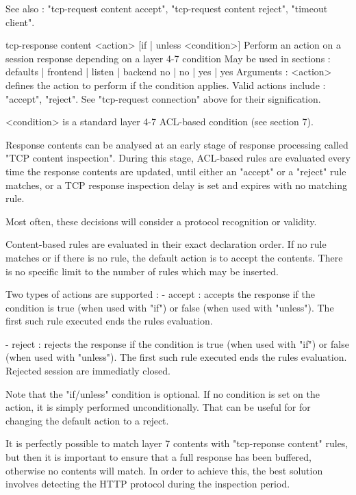   See also : "tcp-request content accept", "tcp-request content reject",
             "timeout client".


tcp-response content <action> [{if | unless} <condition>]
  Perform an action on a session response depending on a layer 4-7 condition
  May be used in sections :   defaults | frontend | listen | backend
                                 no    |    no    |   yes  |   yes
  Arguments :
    <action>    defines the action to perform if the condition applies. Valid
                actions include : "accept", "reject".
                See "tcp-request connection" above for their signification.

    <condition> is a standard layer 4-7 ACL-based condition (see section 7).

  Response contents can be analysed at an early stage of response processing
  called "TCP content inspection". During this stage, ACL-based rules are
  evaluated every time the response contents are updated, until either an
  "accept" or a "reject" rule matches, or a TCP response inspection delay is
  set and expires with no matching rule.

  Most often, these decisions will consider a protocol recognition or validity.

  Content-based rules are evaluated in their exact declaration order. If no
  rule matches or if there is no rule, the default action is to accept the
  contents. There is no specific limit to the number of rules which may be
  inserted.

  Two types of actions are supported :
    - accept :
        accepts the response if the condition is true (when used with "if")
        or false (when used with "unless"). The first such rule executed ends
        the rules evaluation.

    - reject :
        rejects the response if the condition is true (when used with "if")
        or false (when used with "unless"). The first such rule executed ends
        the rules evaluation. Rejected session are immediatly closed.

  Note that the "if/unless" condition is optional. If no condition is set on
  the action, it is simply performed unconditionally. That can be useful for
  for changing the default action to a reject.

  It is perfectly possible to match layer 7 contents with "tcp-reponse content"
  rules, but then it is important to ensure that a full response has been
  buffered, otherwise no contents will match. In order to achieve this, the
  best solution involves detecting the HTTP protocol during the inspection
  period.

